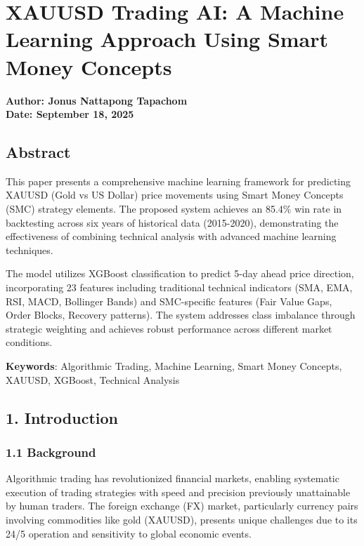 \section{XAUUSD Trading AI: A Machine Learning Approach Using Smart
Money
Concepts}\label{xauusd-trading-ai-a-machine-learning-approach-using-smart-money-concepts}

\textbf{Author: Jonus Nattapong Tapachom}\\
\textbf{Date: September 18, 2025}

\subsection{Abstract}\label{abstract}

This paper presents a comprehensive machine learning framework for
predicting XAUUSD (Gold vs US Dollar) price movements using Smart Money
Concepts (SMC) strategy elements. The proposed system achieves an 85.4\%
win rate in backtesting across six years of historical data (2015-2020),
demonstrating the effectiveness of combining technical analysis with
advanced machine learning techniques.

The model utilizes XGBoost classification to predict 5-day ahead price
direction, incorporating 23 features including traditional technical
indicators (SMA, EMA, RSI, MACD, Bollinger Bands) and SMC-specific
features (Fair Value Gaps, Order Blocks, Recovery patterns). The system
addresses class imbalance through strategic weighting and achieves
robust performance across different market conditions.

\textbf{Keywords}: Algorithmic Trading, Machine Learning, Smart Money
Concepts, XAUUSD, XGBoost, Technical Analysis

\subsection{1. Introduction}\label{introduction}

\subsubsection{1.1 Background}\label{background}

Algorithmic trading has revolutionized financial markets, enabling
systematic execution of trading strategies with speed and precision
previously unattainable by human traders. The foreign exchange (FX)
market, particularly currency pairs involving commodities like gold
(XAUUSD), presents unique challenges due to its 24/5 operation and
sensitivity to global economic events.

